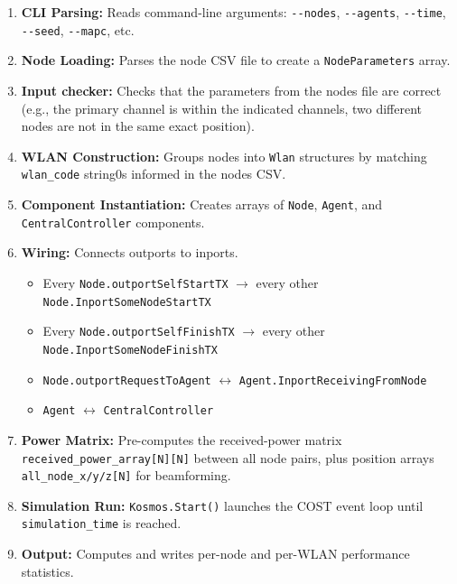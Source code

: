 \documentclass[11pt,a4paper]{article}
\begin{document}
\begin{enumerate}[nosep]
  \item \textbf{CLI Parsing:} Reads command-line arguments: \texttt{-{}-nodes}, \texttt{-{}-agents}, \texttt{-{}-time}, \texttt{-{}-seed}, \texttt{-{}-mapc}, etc.
  \item \textbf{Node Loading:} Parses the node CSV file to create a \texttt{NodeParameters} array.
  \item \textbf{Input checker:} Checks that the parameters from the nodes file are correct (e.g., the primary channel is within the indicated channels, two different nodes are not in the same exact position).
  \item \textbf{WLAN Construction:} Groups nodes into \texttt{Wlan} structures by matching \texttt{wlan\_code} string0s informed in the nodes CSV.
  \item \textbf{Component Instantiation:} Creates arrays of \texttt{Node}, \texttt{Agent}, and \texttt{CentralController} components.
  \item \textbf{Wiring:} Connects outports to inports.
    \begin{itemize}[nosep]
      \item Every \texttt{Node.outportSelfStartTX} $\to$ every other \texttt{Node.InportSomeNodeStartTX}
      \item Every \texttt{Node.outportSelfFinishTX} $\to$ every other \texttt{Node.InportSomeNodeFinishTX}
      \item \texttt{Node.outportRequestToAgent} $\leftrightarrow$ \texttt{Agent.InportReceivingFromNode}
      \item \texttt{Agent} $\leftrightarrow$ \texttt{CentralController}
    \end{itemize}
  \item \textbf{Power Matrix:} Pre-computes the received-power matrix \texttt{received\_power\_array[N][N]} between all node pairs, plus position arrays \texttt{all\_node\_x/y/z[N]} for beamforming.
  \item \textbf{Simulation Run:} \texttt{Kosmos.Start()} launches the COST event loop until \texttt{simulation\_time} is reached.
  \item \textbf{Output:} Computes and writes per-node and per-WLAN performance statistics.
\end{enumerate}
\end{document}
